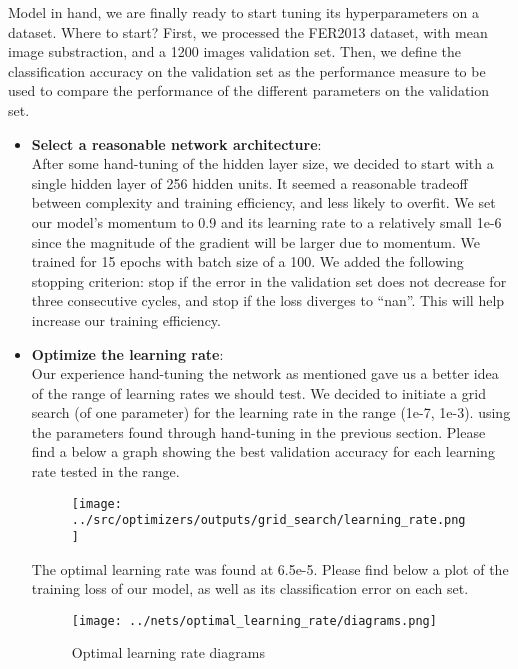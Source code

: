 Model in hand, we are finally ready to start tuning its hyperparameters on a dataset.
Where to start?
First, we processed the FER2013 dataset, with mean image substraction, and a 1200 images validation set.
Then, we define the classification accuracy on the validation set as
the performance measure to be used to compare the performance of the different parameters on the validation set.

\begin{itemize}[topsep=-10pt]
\item \textbf{Select a reasonable network architecture}:\\
  After some hand-tuning of the hidden layer size, we decided to start with a single hidden layer of 256 hidden units.
  It seemed a reasonable tradeoff between complexity and training efficiency, and less likely to overfit.
  We set our model's momentum to 0.9 and its learning rate to a relatively small 1e-6
  since the magnitude of the gradient will be larger due to momentum.
  We trained for 15 epochs with batch size of a 100.
  We added the following stopping criterion: stop if the error in the validation set does not decrease for three consecutive cycles,
  and stop if the loss diverges to ``nan''.
  This will help increase our training efficiency.

\item \textbf{Optimize the learning rate}:\\
  Our experience hand-tuning the network as mentioned gave us a better idea of the range of learning rates we should test.
  We decided to initiate a grid search (of one parameter) for the learning rate in the range (1e-7, 1e-3).
  using the parameters found through hand-tuning in the previous section.
  Please find a below a graph showing the best validation accuracy for each learning rate tested in the range.
  \begin{figure}[!ht]
      \centering
      {{\texttt{[image: ../src/optimizers/outputs/grid\_search/learning\_rate.png]}}}
  \end{figure}

  The optimal learning rate was found at 6.5e-5.
  Please find below a plot of the training loss of our model, as well as its classification error on each set.
  

  \begin{figure}[!ht]
    \caption{Optimal learning rate diagrams}
    \centering
        {{\texttt{[image: ../nets/optimal\_learning\_rate/diagrams.png]}}}  
  \end{figure}
  

\end{itemize}
